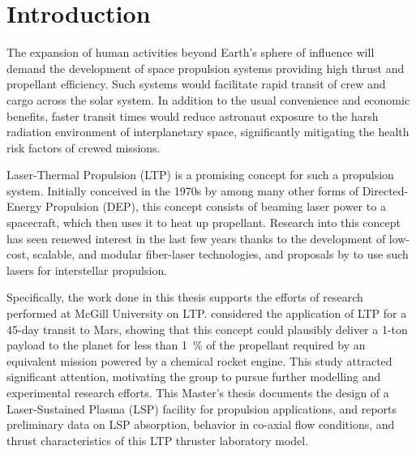 \chapter{Introduction}
    The expansion of human activities beyond Earth's sphere of influence will demand the development of space propulsion systems providing high thrust and propellant efficiency. Such systems would facilitate rapid transit of crew and cargo across the solar system. In addition to the usual convenience and economic benefits, faster transit times would reduce astronaut exposure to the harsh radiation environment of interplanetary space, significantly mitigating the health risk factors of crewed missions.

    Laser-Thermal Propulsion (LTP) is a promising concept for such a propulsion system. Initially conceived in the 1970s by \textcite{kantrowitzRelevanceSpace1971} among many other forms of Directed-Energy Propulsion (DEP), this concept consists of beaming laser power to a spacecraft, which then uses it to heat up propellant. Research into this concept has seen renewed interest in the last few years thanks to the development of low-cost, scalable, and modular fiber-laser technologies, and proposals by \textcite{lubinRoadmapInterstellarFlight2022} to use such lasers for interstellar propulsion.

    Specifically, the work done in this thesis supports the efforts of research performed at McGill University on LTP. \textcite{duplayDesignRapidTransit2022} considered the application of LTP for a 45-day transit to Mars, showing that this concept could plausibly deliver a 1-ton payload to the planet for less than 1~\% of the propellant required by an equivalent mission powered by a chemical rocket engine. This study attracted significant attention, motivating the group to pursue further modelling and experimental research efforts. This Master's thesis documents the design of a Laser-Sustained Plasma (LSP) facility for propulsion applications, and reports preliminary data on LSP absorption, behavior in co-axial flow conditions, and thrust characteristics of this LTP thruster laboratory model.